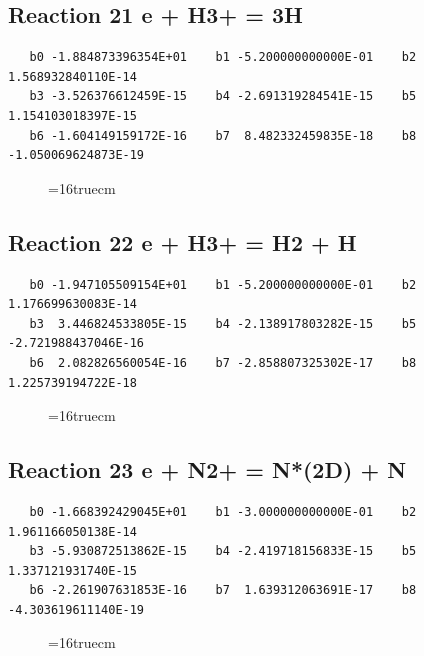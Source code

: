 \documentclass[12pt,dvipdfm]{article}
\begin{document}
\subsection{
Reaction 21 e + H3+ = 3H}
\begin{small}\begin{verbatim}
   b0 -1.884873396354E+01    b1 -5.200000000000E-01    b2  1.568932840110E-14
   b3 -3.526376612459E-15    b4 -2.691319284541E-15    b5  1.154103018397E-15
   b6 -1.604149159172E-16    b7  8.482332459835E-18    b8 -1.050069624873E-19
   \end{verbatim}\end{small}
\begin{figure}[h!]
\label{n2rates}
\epsfxsize=16truecm
\end{figure}
\newpage

\subsection{
Reaction 22 e + H3+ = H2 + H}
\begin{small}\begin{verbatim}
   b0 -1.947105509154E+01    b1 -5.200000000000E-01    b2  1.176699630083E-14
   b3  3.446824533805E-15    b4 -2.138917803282E-15    b5 -2.721988437046E-16
   b6  2.082826560054E-16    b7 -2.858807325302E-17    b8  1.225739194722E-18
   \end{verbatim}\end{small}
\begin{figure}[h!]
\label{n2rates}
\epsfxsize=16truecm
\end{figure}
\newpage

\subsection{
Reaction 23 e + N2+ = N*(2D) + N}
\begin{small}\begin{verbatim}
   b0 -1.668392429045E+01    b1 -3.000000000000E-01    b2  1.961166050138E-14
   b3 -5.930872513862E-15    b4 -2.419718156833E-15    b5  1.337121931740E-15
   b6 -2.261907631853E-16    b7  1.639312063691E-17    b8 -4.303619611140E-19
   \end{verbatim}\end{small}
\begin{figure}[h!]
\label{n2rates}
\epsfxsize=16truecm
\end{figure}
\newpage
\end{document}

